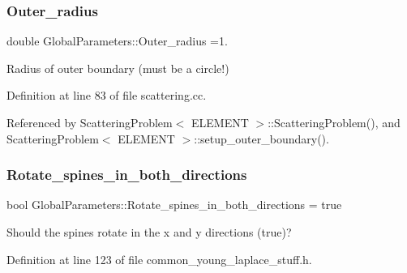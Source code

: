 \mbox{\label{namespaceGlobalParameters_a61b086072a6b8fd38af1a85f1dd1674a}} 
\subsubsection{\texorpdfstring{Outer\+\_\+radius}{Outer\_radius}}
{\footnotesize\ttfamily double Global\+Parameters\+::\+Outer\+\_\+radius =1.}



Radius of outer boundary (must be a circle!) 



Definition at line 83 of file scattering.\+cc.



Referenced by Scattering\+Problem$<$ E\+L\+E\+M\+E\+N\+T $>$\+::\+Scattering\+Problem(), and Scattering\+Problem$<$ E\+L\+E\+M\+E\+N\+T $>$\+::setup\+\_\+outer\+\_\+boundary().

\mbox{\label{namespaceGlobalParameters_a69a238365a4fef33b1abdae287185f3e}} 
\subsubsection{\texorpdfstring{Rotate\+\_\+spines\+\_\+in\+\_\+both\+\_\+directions}{Rotate\_spines\_in\_both\_directions}}
{\footnotesize\ttfamily bool Global\+Parameters\+::\+Rotate\+\_\+spines\+\_\+in\+\_\+both\+\_\+directions = true}



Should the spines rotate in the x and y directions (true)? 



Definition at line 123 of file common\+\_\+young\+\_\+laplace\+\_\+stuff.\+h.

\mbox{\label{namespaceGlobalParameters_aeb81cc1c282502497ef6df576559b650}} 
